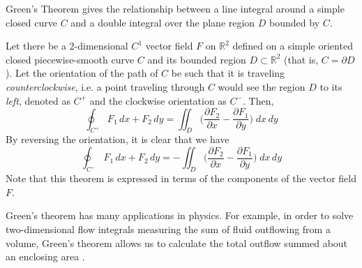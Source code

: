   Green's Theorem gives the relationship between a line integral around a simple closed curve $C$ and a double integral over the plane region $D$ bounded by $C$. 

  \begin{theorem}
		Let there be a 2-dimensional $C^1$ vector field $F$ on $\mathbb{R}^2$ defined on a simple oriented closed piecewise-smooth curve $C$ and its bounded region $D \subset \mathbb{R}^2$ (that is, $C = \partial D$). Let the orientation of the path of $C$ be such that it is traveling \textit{counterclockwise}, i.e. a point traveling through $C$ would see the region $D$ to its \textit{left}, denoted as $C^+$ and the clockwise orientation as $C^-$.  Then, 
		\begin{equation}
			\oint_{C^+} F_1 \, d x + F_2 \, d y = \iint_D \bigg( \frac{\partial F_2}{\partial x} - \frac{\partial F_1}{\partial y} \bigg) \; d x \, d y
		\end{equation}
		By reversing the orientation, it is clear that we have
		\begin{equation}
			\oint_{C^-} F_1 \, d x + F_2 \, d y = - \iint_D \bigg( \frac{\partial F_2}{\partial x} - \frac{\partial F_1}{\partial y} \bigg) \; d x \, d y
		\end{equation}
		Note that this theorem is expressed in terms of the components of the vector field $F$. 
		\begin{center}
		\end{center}
  \end{theorem}

  Green's theorem has many applications in physics. For example, in order to solve two-dimensional flow integrals measuring the sum of fluid outflowing from a volume, Green's theorem allows us to calculate the total outflow summed about an enclosing area . 

